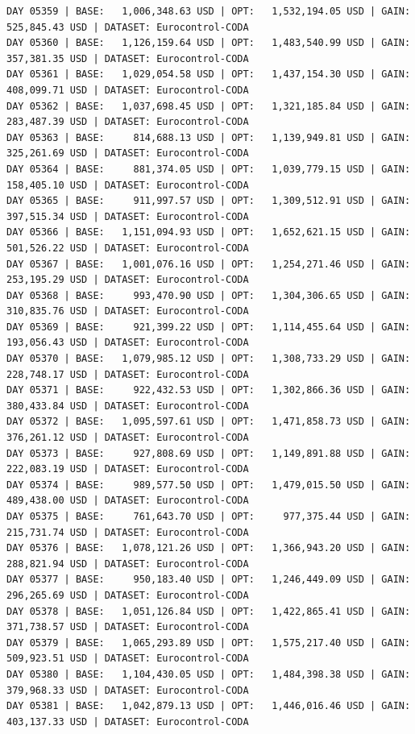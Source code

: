 \documentclass[11pt,a4paper]{article}
\begin{document}
\begin{verbatim}
DAY 05359 | BASE:   1,006,348.63 USD | OPT:   1,532,194.05 USD | GAIN: 525,845.43 USD | DATASET: Eurocontrol-CODA
DAY 05360 | BASE:   1,126,159.64 USD | OPT:   1,483,540.99 USD | GAIN: 357,381.35 USD | DATASET: Eurocontrol-CODA
DAY 05361 | BASE:   1,029,054.58 USD | OPT:   1,437,154.30 USD | GAIN: 408,099.71 USD | DATASET: Eurocontrol-CODA
DAY 05362 | BASE:   1,037,698.45 USD | OPT:   1,321,185.84 USD | GAIN: 283,487.39 USD | DATASET: Eurocontrol-CODA
DAY 05363 | BASE:     814,688.13 USD | OPT:   1,139,949.81 USD | GAIN: 325,261.69 USD | DATASET: Eurocontrol-CODA
DAY 05364 | BASE:     881,374.05 USD | OPT:   1,039,779.15 USD | GAIN: 158,405.10 USD | DATASET: Eurocontrol-CODA
DAY 05365 | BASE:     911,997.57 USD | OPT:   1,309,512.91 USD | GAIN: 397,515.34 USD | DATASET: Eurocontrol-CODA
DAY 05366 | BASE:   1,151,094.93 USD | OPT:   1,652,621.15 USD | GAIN: 501,526.22 USD | DATASET: Eurocontrol-CODA
DAY 05367 | BASE:   1,001,076.16 USD | OPT:   1,254,271.46 USD | GAIN: 253,195.29 USD | DATASET: Eurocontrol-CODA
DAY 05368 | BASE:     993,470.90 USD | OPT:   1,304,306.65 USD | GAIN: 310,835.76 USD | DATASET: Eurocontrol-CODA
DAY 05369 | BASE:     921,399.22 USD | OPT:   1,114,455.64 USD | GAIN: 193,056.43 USD | DATASET: Eurocontrol-CODA
DAY 05370 | BASE:   1,079,985.12 USD | OPT:   1,308,733.29 USD | GAIN: 228,748.17 USD | DATASET: Eurocontrol-CODA
DAY 05371 | BASE:     922,432.53 USD | OPT:   1,302,866.36 USD | GAIN: 380,433.84 USD | DATASET: Eurocontrol-CODA
DAY 05372 | BASE:   1,095,597.61 USD | OPT:   1,471,858.73 USD | GAIN: 376,261.12 USD | DATASET: Eurocontrol-CODA
DAY 05373 | BASE:     927,808.69 USD | OPT:   1,149,891.88 USD | GAIN: 222,083.19 USD | DATASET: Eurocontrol-CODA
DAY 05374 | BASE:     989,577.50 USD | OPT:   1,479,015.50 USD | GAIN: 489,438.00 USD | DATASET: Eurocontrol-CODA
DAY 05375 | BASE:     761,643.70 USD | OPT:     977,375.44 USD | GAIN: 215,731.74 USD | DATASET: Eurocontrol-CODA
DAY 05376 | BASE:   1,078,121.26 USD | OPT:   1,366,943.20 USD | GAIN: 288,821.94 USD | DATASET: Eurocontrol-CODA
DAY 05377 | BASE:     950,183.40 USD | OPT:   1,246,449.09 USD | GAIN: 296,265.69 USD | DATASET: Eurocontrol-CODA
DAY 05378 | BASE:   1,051,126.84 USD | OPT:   1,422,865.41 USD | GAIN: 371,738.57 USD | DATASET: Eurocontrol-CODA
DAY 05379 | BASE:   1,065,293.89 USD | OPT:   1,575,217.40 USD | GAIN: 509,923.51 USD | DATASET: Eurocontrol-CODA
DAY 05380 | BASE:   1,104,430.05 USD | OPT:   1,484,398.38 USD | GAIN: 379,968.33 USD | DATASET: Eurocontrol-CODA
DAY 05381 | BASE:   1,042,879.13 USD | OPT:   1,446,016.46 USD | GAIN: 403,137.33 USD | DATASET: Eurocontrol-CODA

\end{verbatim}
\end{document}
